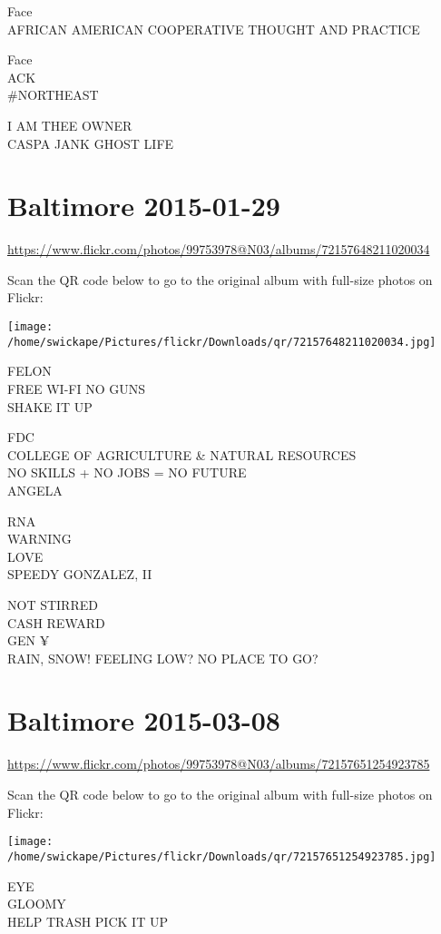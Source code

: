 \documentclass[10pt,letterpaper]{article}
\begin{document}
Face\\
AFRICAN AMERICAN COOPERATIVE THOUGHT AND PRACTICE

Face\\
ACK\\
\#NORTHEAST

I AM THEE OWNER\\
CASPA JANK GHOST LIFE
\pagebreak

\section*{Baltimore 2015-01-29}

\url{https://www.flickr.com/photos/99753978@N03/albums/72157648211020034}

Scan the QR code below to go to the original album with full-size photos on Flickr:

\texttt{[image: /home/swickape/Pictures/flickr/Downloads/qr/72157648211020034.jpg]}
\pagebreak

FELON\\
FREE WI{-}FI NO GUNS\\
SHAKE IT UP

FDC\\
COLLEGE OF AGRICULTURE \& NATURAL RESOURCES\\
NO SKILLS + NO JOBS = NO FUTURE\\
ANGELA

RNA\\
WARNING\\
LOVE\\
SPEEDY GONZALEZ, II

NOT STIRRED\\
CASH REWARD\\
GEN ¥\\
RAIN, SNOW!  FEELING LOW?  NO PLACE TO GO?
\pagebreak

\section*{Baltimore 2015-03-08}

\url{https://www.flickr.com/photos/99753978@N03/albums/72157651254923785}

Scan the QR code below to go to the original album with full-size photos on Flickr:

\texttt{[image: /home/swickape/Pictures/flickr/Downloads/qr/72157651254923785.jpg]}
\pagebreak

EYE\\
GLOOMY\\
HELP TRASH PICK IT UP
\end{document}
